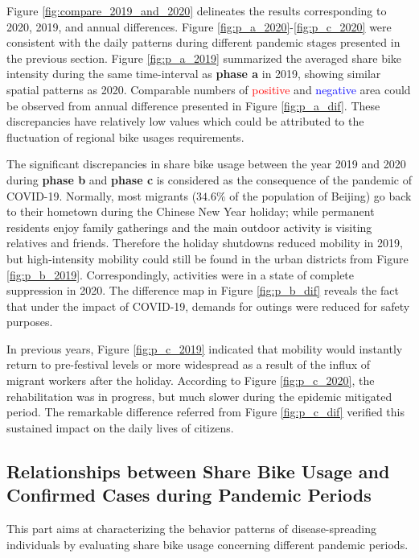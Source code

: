 \documentclass[ijgi,submit,moreauthors,pdftex]{Definitions/mdpi}
\begin{document}
Figure \ref{fig:compare_2019_and_2020} delineates the results corresponding to 2020, 2019, and annual differences.
Figure \ref{fig:p_a_2020}-\ref{fig:p_c_2020} were consistent with the daily patterns during different pandemic stages presented in the previous section.
Figure \ref{fig:p_a_2019} summarized the averaged share bike intensity during the same time-interval as \textbf{phase a} in 2019, showing similar spatial patterns as 2020. 
Comparable numbers of \textcolor{red}{positive} and \textcolor{blue}{negative} area could be observed from annual difference presented in Figure \ref{fig:p_a_dif}. These discrepancies have relatively low values which could be attributed to the fluctuation of regional bike usages requirements.  

The significant discrepancies in share bike usage between the year 2019 and 2020 during \textbf{phase b} and \textbf{phase c} is considered as the consequence of the pandemic of COVID-19. 
Normally, most migrants ($34.6\%$ of the population of Beijing) go back to their hometown during the Chinese New Year holiday; while permanent residents enjoy family gatherings and the main outdoor activity is visiting relatives and friends.
Therefore the holiday shutdowns reduced mobility in 2019, but high-intensity mobility could still be found in the urban districts from Figure \ref{fig:p_b_2019}. 
Correspondingly, activities were in a state of complete suppression in 2020. 
The difference map in Figure \ref{fig:p_b_dif} reveals the fact that under the impact of COVID-19, demands for outings were reduced for safety purposes.

In previous years, Figure \ref{fig:p_c_2019} indicated that mobility would instantly return to pre-festival levels or more widespread as a result of the influx of migrant workers after the holiday.
According to Figure \ref{fig:p_c_2020}, the rehabilitation was in progress, but much slower during the epidemic mitigated period.
The remarkable difference referred from Figure \ref{fig:p_c_dif} verified this sustained impact on the daily lives of citizens.

\subsection{Relationships between Share Bike Usage and Confirmed Cases during Pandemic Periods} \label{sec:activities_confirmed_cases}

This part aims at characterizing the behavior patterns of disease-spreading individuals by evaluating share bike usage concerning different pandemic periods.%
\end{document}
